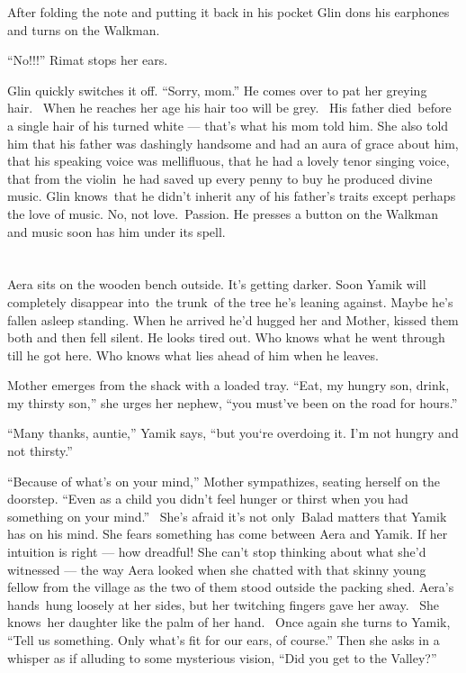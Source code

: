 \documentclass[twoside,11pt]{book}
\begin{document}
{After folding the
}note{ }{and putting it back
in his pocket Glin dons his earphones and turns on the Walkman. }

``No!!!'' Rimat stops her ears.

Glin quickly
switches {it off. ``Sorry, mom.'' }He comes over to pat her greying
hair.~ When he reaches her age his hair too will be grey.~ His father died~before a single hair of his turned white ---
that's what his mom told him.  She also told him that{ }his father was dashingly handsome and had an
aura of grace about him, that his speaking voice was mellifluous, that he had a lovely tenor singing voice, that from
the violin~he had saved up every penny to buy he produced divine music. Glin knows~that
{he didn't inherit any of his father's traits except perhaps the
love of music. No, not love.~Passion. He }presses {a button on the
Walkman and }music soon has him under its spell.

\chapter{}

{Aera sits on the wooden bench
out}side{. }It's getting darker.
Soon{ Yamik will completely disappear into~the trunk~of the tree he's
leaning against. Maybe he's fallen asleep standing. When he }arrived he'd hugged her and Mother, kissed them both
and then fell silent. He looks tired out. Who knows what he went through till he got here. Who knows what lies ahead of
him when he leaves.

Mother emerges from the shack with a loaded tray. {{}``Eat, my hungry
son, drink, my thirsty son,'' she urges her
}{nephew}{, ``you must've been on the road for
hours.''}

{{}``Many thanks, auntie,'' Yamik says,
``but you`re overdoing it. I'm not hungry }and
not {thirsty.''}

``Because of what's on your mind,'' Mother sympathizes, seating herself on the doorstep. ``Even as a child you
didn't feel hunger or thirst when you had something on your mind.''~ She's afraid it's not only~Balad matters that
Yamik has on his mind. She fears something has come between Aera and Yamik. If her intuition is right --- how dreadful!
She can't stop thinking about what she'd witnessed --- the way Aera looked when she chatted with that
skinny{ }young fellow from the village as the two of them stood outside the packing shed. Aera's
hands~hung loosely at her sides, but her twitching fingers gave her away.~ She knows~her daughter like the palm of her
hand.~ Once again she turns to Yamik, ``Tell us something. Only what's fit for our ears, of course.{}'' Then she asks
in a whisper as if alluding to some mysterious vision, ``Did you get to the Valley?''
\end{document}
